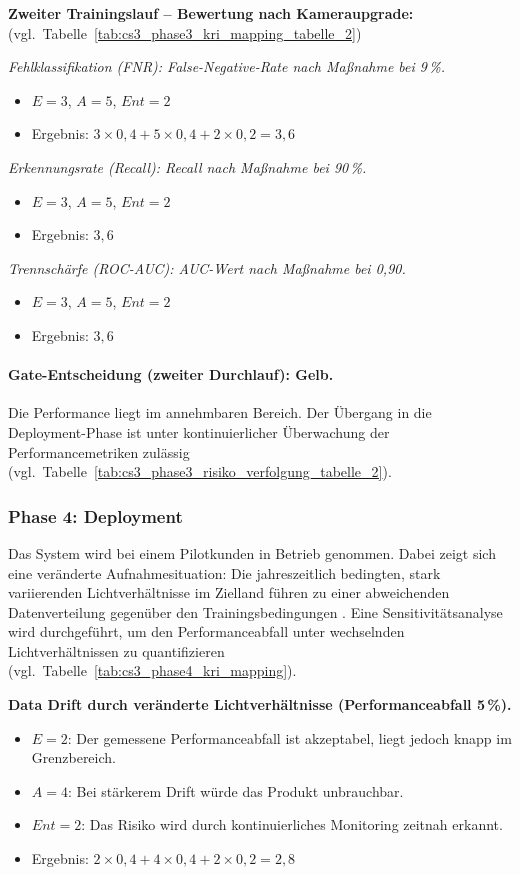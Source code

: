 \textbf{Zweiter Trainingslauf -- Bewertung nach Kameraupgrade:}
(vgl.\ Tabelle~\ref{tab:cs3_phase3_kri_mapping_tabelle_2})

\textit{Fehlklassifikation (FNR): False-Negative-Rate nach Maßnahme bei 9\,\%.}
\begin{itemize}
    \item $E = 3$, $A = 5$, $Ent = 2$
    \item Ergebnis: $3 \times 0{,}4 + 5 \times 0{,}4 + 2 \times 0{,}2 = 3{,}6$
\end{itemize}

\textit{Erkennungsrate (Recall): Recall nach Maßnahme bei 90\,\%.}
\begin{itemize}
    \item $E = 3$, $A = 5$, $Ent = 2$
    \item Ergebnis: $3{,}6$
\end{itemize}

\textit{Trennschärfe (ROC-AUC): AUC-Wert nach Maßnahme bei 0{,}90.}
\begin{itemize}
    \item $E = 3$, $A = 5$, $Ent = 2$
    \item Ergebnis: $3{,}6$
\end{itemize}

\paragraph{Gate-Entscheidung (zweiter Durchlauf): Gelb.}
Die Performance liegt im annehmbaren Bereich. Der Übergang in die Deployment-Phase
ist unter kontinuierlicher Überwachung der Performancemetriken zulässig
(vgl.\ Tabelle~\ref{tab:cs3_phase3_risiko_verfolgung_tabelle_2}).

\subsubsection{Phase 4: Deployment}

Das System wird bei einem Pilotkunden in Betrieb genommen. Dabei zeigt sich eine
veränderte Aufnahmesituation: Die jahreszeitlich bedingten, stark variierenden
Lichtverhältnisse im Zielland führen zu einer abweichenden Datenverteilung
gegenüber den Trainingsbedingungen \citep{bayram_concept_2022}. Eine Sensitivitätsanalyse wird durchgeführt,
um den Performanceabfall unter wechselnden Lichtverhältnissen zu quantifizieren
(vgl.\ Tabelle~\ref{tab:cs3_phase4_kri_mapping}).

\textbf{Data Drift durch veränderte Lichtverhältnisse (Performanceabfall 5\,\%).}
\begin{itemize}
    \item $E = 2$: Der gemessene Performanceabfall ist akzeptabel, liegt jedoch
    knapp im Grenzbereich.
    \item $A = 4$: Bei stärkerem Drift würde das Produkt unbrauchbar.
    \item $Ent = 2$: Das Risiko wird durch kontinuierliches Monitoring zeitnah
    erkannt.
    \item Ergebnis: $2 \times 0{,}4 + 4 \times 0{,}4 + 2 \times 0{,}2 = 2{,}8$
\end{itemize}

